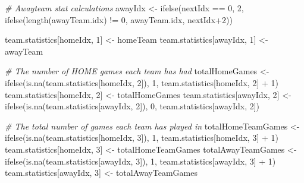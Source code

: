 \documentclass[
]{article}
\newenvironment{Shaded}{\begin{snugshade}}{\end{snugshade}}
\newcommand{\CommentTok}[1]{\textcolor[rgb]{0.56,0.35,0.01}{\textit{#1}}}
\newcommand{\DecValTok}[1]{\textcolor[rgb]{0.00,0.00,0.81}{#1}}
\newcommand{\FunctionTok}[1]{\textcolor[rgb]{0.00,0.00,0.00}{#1}}
\newcommand{\NormalTok}[1]{#1}
\newcommand{\OtherTok}[1]{\textcolor[rgb]{0.56,0.35,0.01}{#1}}
\newcommand{\SpecialCharTok}[1]{\textcolor[rgb]{0.00,0.00,0.00}{#1}}
\begin{document}
\begin{Shaded}
\begin{Highlighting}[]
    \CommentTok{\# Awayteam stat calculations}
\NormalTok{    awayIdx }\OtherTok{\textless{}{-}} \FunctionTok{ifelse}\NormalTok{(nextIdx }\SpecialCharTok{==} \DecValTok{0}\NormalTok{, }\DecValTok{2}\NormalTok{, }\FunctionTok{ifelse}\NormalTok{(}\FunctionTok{length}\NormalTok{(awayTeam.idx) }\SpecialCharTok{!=} \DecValTok{0}\NormalTok{, awayTeam.idx, nextIdx}\SpecialCharTok{+}\DecValTok{2}\NormalTok{))}
  
\NormalTok{    team.statistics[homeIdx, }\DecValTok{1}\NormalTok{] }\OtherTok{\textless{}{-}}\NormalTok{ homeTeam }
\NormalTok{    team.statistics[awayIdx, }\DecValTok{1}\NormalTok{] }\OtherTok{\textless{}{-}}\NormalTok{ awayTeam }
    
    \CommentTok{\# The number of HOME games each team has had}
\NormalTok{    totalHomeGames }\OtherTok{\textless{}{-}} \FunctionTok{ifelse}\NormalTok{(}\FunctionTok{is.na}\NormalTok{(team.statistics[homeIdx, }\DecValTok{2}\NormalTok{]), }\DecValTok{1}\NormalTok{, team.statistics[homeIdx, }\DecValTok{2}\NormalTok{] }\SpecialCharTok{+} \DecValTok{1}\NormalTok{)}
\NormalTok{    team.statistics[homeIdx, }\DecValTok{2}\NormalTok{] }\OtherTok{\textless{}{-}}\NormalTok{ totalHomeGames }
\NormalTok{    team.statistics[awayIdx, }\DecValTok{2}\NormalTok{] }\OtherTok{\textless{}{-}} \FunctionTok{ifelse}\NormalTok{(}\FunctionTok{is.na}\NormalTok{(team.statistics[awayIdx, }\DecValTok{2}\NormalTok{]), }\DecValTok{0}\NormalTok{, team.statistics[awayIdx, }\DecValTok{2}\NormalTok{])}
  
    \CommentTok{\# The total number of games each team has played in}
\NormalTok{    totalHomeTeamGames }\OtherTok{\textless{}{-}} \FunctionTok{ifelse}\NormalTok{(}\FunctionTok{is.na}\NormalTok{(team.statistics[homeIdx, }\DecValTok{3}\NormalTok{]), }\DecValTok{1}\NormalTok{, team.statistics[homeIdx, }\DecValTok{3}\NormalTok{] }\SpecialCharTok{+} \DecValTok{1}\NormalTok{)}
\NormalTok{    team.statistics[homeIdx, }\DecValTok{3}\NormalTok{] }\OtherTok{\textless{}{-}}\NormalTok{ totalHomeTeamGames }
\NormalTok{    totalAwayTeamGames }\OtherTok{\textless{}{-}} \FunctionTok{ifelse}\NormalTok{(}\FunctionTok{is.na}\NormalTok{(team.statistics[awayIdx, }\DecValTok{3}\NormalTok{]), }\DecValTok{1}\NormalTok{, team.statistics[awayIdx, }\DecValTok{3}\NormalTok{] }\SpecialCharTok{+} \DecValTok{1}\NormalTok{)}
\NormalTok{    team.statistics[awayIdx, }\DecValTok{3}\NormalTok{] }\OtherTok{\textless{}{-}}\NormalTok{ totalAwayTeamGames }
  

\end{Highlighting}
\end{Shaded}
\end{document}

